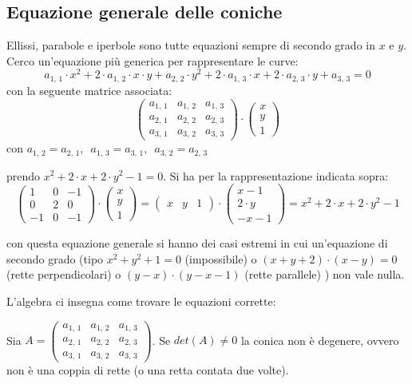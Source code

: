 \documentclass[a4paper,12pt, oneside]{book}
\begin{document}
\subsection{Equazione generale delle coniche}
Ellissi, parabole e iperbole sono tutte equazioni sempre di secondo grado in $x$ e $y$. Cerco un'equazione più generica per rappresentare le curve:
$$a_{1,\,1}\cdot x^2+2\cdot a_{1,\,2}\cdot x\cdot y+a_{2,\,2}\cdot y^2+2\cdot a_{1,\,3}\cdot x+2\cdot a_{2,\,3}\cdot y+a_{3,\,3}=0$$
con la seguente matrice associata:
$$
\left(\begin{matrix}
a_{1,\,1} & a_{1,\,2} & a_{1,\,3}\\
a_{2,\,1} & a_{2,\,2} & a_{2,\,3}\\
a_{3,\,1} & a_{3,\,2} & a_{3,\,3}
\end{matrix}\right)\cdot
\left(\begin{matrix}
x\\
y\\
1
\end{matrix}\right)
$$
con $a_{1,\,2}=a_{2,\,1},\,\,\, a_{1,\,3}=a_{3,\,1},\,\,\,a_{3,\,2}=a_{2,\,3}$
\begin{esempio}
prendo $x^2+2\cdot x+2\cdot y^2-1=0$. Si ha per la rappresentazione indicata sopra:
$$
\left(\begin{matrix}
1 & 0 & -1\\
0 & 2 & 0\\
-1 & 0 & -1
\end{matrix}\right)\cdot
\left(\begin{matrix}
x\\
y\\
1
\end{matrix}\right)=\left(\begin{matrix}
x & y & 1
\end{matrix}\right)\cdot\left(\begin{matrix}
x-1\\
2\cdot y\\
-x-1
\end{matrix}\right)=x^2+2\cdot x+2\cdot y^2-1
$$
\end{esempio}

con questa equazione generale si hanno dei casi estremi in cui un'equazione di secondo grado (tipo $x^2+y^2+1=0$ (impossibile) o $(x+y+2)\cdot(x-y)=0$ (rette perpendicolari) o $(y-x)\cdot (y-x-1)$ (rette parallele) ) non vale nulla.
\newpage

 L'algebra ci insegna come trovare le equazioni corrette:
\begin{teorema} 
Sia $A=
\left(\begin{matrix}
a_{1,\,1} & a_{1,\,2} & a_{1,\,3}\\
a_{2,\,1} & a_{2,\,2} & a_{2,\,3}\\
a_{3,\,1} & a_{3,\,2} & a_{3,\,3}
\end{matrix}\right)$. Se $det(A)\neq 0$ la conica non è degenere, ovvero non è una coppia di rette (o una retta contata due volte).
\end{teorema}
\end{document}
